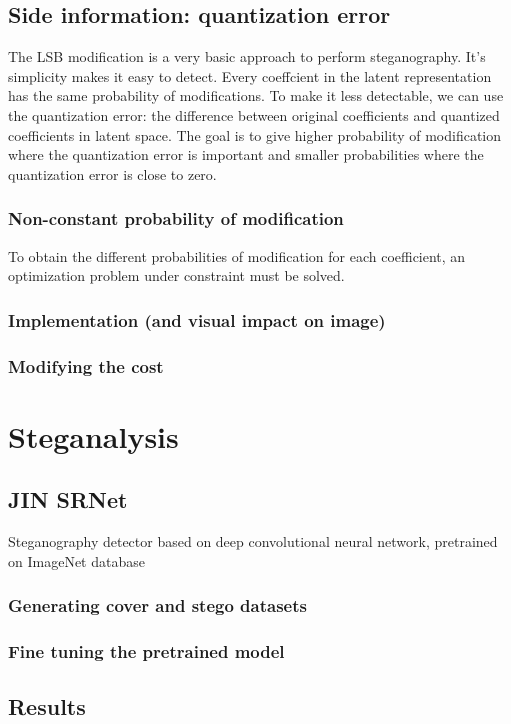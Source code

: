 \documentclass[12pt]{article}
\begin{document}
\subsection{Side information: quantization error}
The LSB modification is a very basic approach to perform steganography. It's simplicity makes it easy to detect. Every coeffcient in the latent representation has the same probability of modifications. To make it less detectable, we can use the quantization error: the difference between original coefficients and quantized coefficients in latent space. The goal is to give higher probability of modification where the quantization error is important and smaller probabilities where the quantization error is close to zero.  
\subsubsection{Non-constant probability of modification}
To obtain the different probabilities of modification for each coefficient, an optimization problem under constraint must be solved.

\subsubsection{Implementation (and visual impact on image)}
\subsubsection{Modifying the cost}

\section{Steganalysis}
\subsection{JIN SRNet}
Steganography detector based on deep convolutional neural network, pretrained on ImageNet database
\subsubsection{Generating cover and stego datasets}

\subsubsection{Fine tuning the pretrained model}

\subsection{Results}
\end{document}
